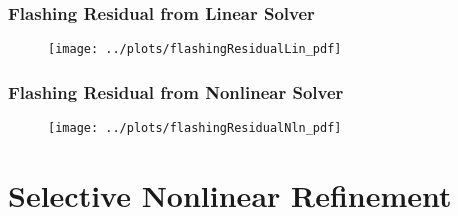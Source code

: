 \documentclass[compress,xcolor=table]{beamer}
\begin{document}
\begin{frame}
\frametitle{Flashing Residual from Linear Solver}

\begin{figure}[h!t]
\centering
\texttt{[image: ../plots/flashingResidualLin\_pdf]}
\end{figure}

\end{frame}
\begin{frame}
\frametitle{Flashing Residual from Nonlinear Solver}

\begin{figure}[h!t]
\centering
\texttt{[image: ../plots/flashingResidualNln\_pdf]}
\end{figure}

\end{frame}
\section[SNR]{Selective Nonlinear Refinement}
\end{document}

